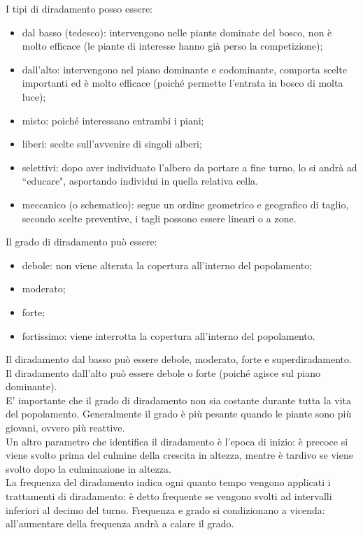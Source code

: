 \documentclass{article}
\begin{document}
I tipi di diradamento posso essere:
\begin{itemize}
    \item dal basso (tedesco): intervengono nelle piante dominate del bosco, non è molto efficace (le piante di interesse hanno già perso la competizione);
    \item dall'alto: intervengono nel piano dominante e codominante, comporta scelte importanti ed è molto efficace (poiché permette l'entrata in bosco di molta luce);
    \item misto: poiché interessano entrambi i piani;
    \item liberi: scelte sull'avvenire di singoli alberi;
    \item selettivi: dopo aver individuato l'albero da portare a fine turno, lo si andrà ad ``educare", asportando individui in quella relativa cella.
    \item meccanico (o schematico): segue un ordine geometrico e geografico di taglio, secondo scelte preventive, i tagli possono essere lineari o a zone.
\end{itemize}
Il grado di diradamento può essere: 
\begin{itemize}
    \item debole: non viene alterata la copertura all'interno del popolamento;
    \item moderato;
    \item forte;
    \item fortissimo: viene interrotta la copertura all'interno del popolamento.
\end{itemize}
Il diradamento dal basso può essere debole, moderato, forte e superdiradamento. Il diradamento dall'alto può essere debole o forte (poiché agisce sul piano dominante).\\
E' importante che il grado di diradamento non sia costante durante tutta la vita del popolamento. Generalmente il grado è più pesante quando le piante sono più giovani, ovvero più reattive.\\
Un altro parametro che identifica il diradamento è l'epoca di inizio: è precoce si viene svolto prima del culmine della crescita in altezza, mentre è tardivo se viene svolto dopo la culminazione in altezza.\\
La frequenza del diradamento indica ogni quanto tempo vengono applicati i trattamenti di diradamento: è detto frequente se vengono svolti ad intervalli inferiori al decimo del turno. Frequenza e grado si condizionano a vicenda: all'aumentare della frequenza andrà a calare il grado.
\end{document}
